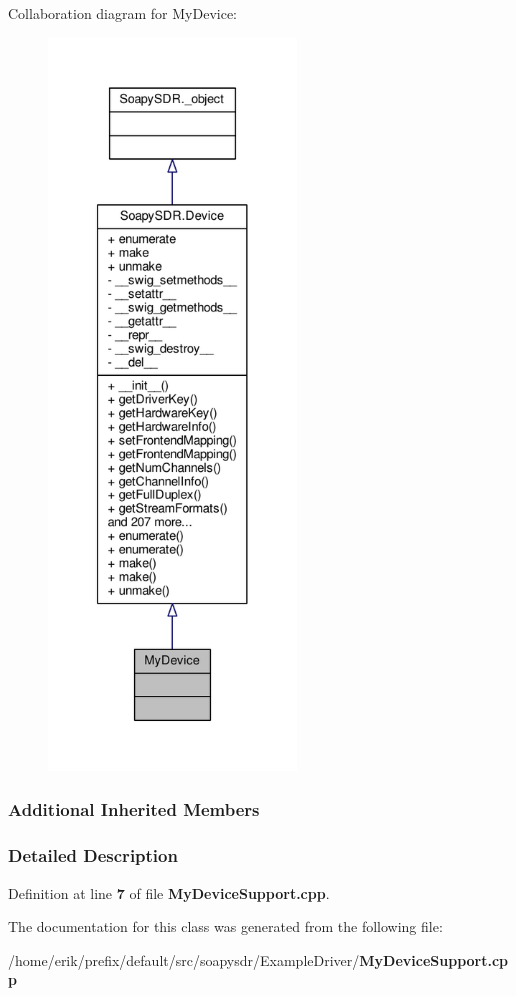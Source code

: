 Collaboration diagram for My\+Device\+:
\nopagebreak
\begin{figure}[H]
\begin{center}
\leavevmode
\includegraphics[height=550pt]{d2/dd6/classMyDevice__coll__graph}
\end{center}
\end{figure}
\subsubsection*{Additional Inherited Members}


\subsubsection{Detailed Description}


Definition at line {\bf 7} of file {\bf My\+Device\+Support.\+cpp}.



The documentation for this class was generated from the following file\+:\begin{DoxyCompactItemize}
\item 
/home/erik/prefix/default/src/soapysdr/\+Example\+Driver/{\bf My\+Device\+Support.\+cpp}\end{DoxyCompactItemize}

